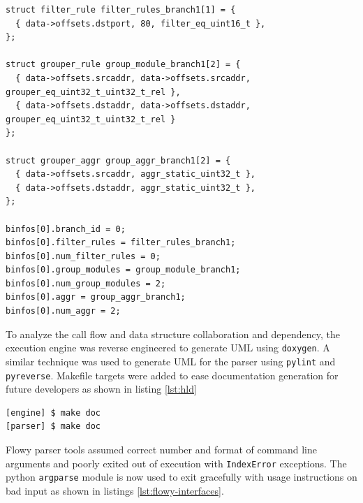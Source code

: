 \begin{lstlisting}
struct filter_rule filter_rules_branch1[1] = {
  { data->offsets.dstport, 80, filter_eq_uint16_t },
};

struct grouper_rule group_module_branch1[2] = {
  { data->offsets.srcaddr, data->offsets.srcaddr, grouper_eq_uint32_t_uint32_t_rel },
  { data->offsets.dstaddr, data->offsets.dstaddr, grouper_eq_uint32_t_uint32_t_rel }
};

struct grouper_aggr group_aggr_branch1[2] = {
  { data->offsets.srcaddr, aggr_static_uint32_t },
  { data->offsets.dstaddr, aggr_static_uint32_t },
};

binfos[0].branch_id = 0;
binfos[0].filter_rules = filter_rules_branch1;
binfos[0].num_filter_rules = 0;
binfos[0].group_modules = group_module_branch1;
binfos[0].num_group_modules = 2;
binfos[0].aggr = group_aggr_branch1;
binfos[0].num_aggr = 2;
\end{lstlisting}

To analyze the call flow and data structure collaboration and dependency, the
execution engine was reverse engineered to generate \ac{UML} using
\texttt{doxygen}.   A similar technique was
used to generate \ac{UML} for the parser using \texttt{pylint} and
\texttt{pyreverse}. Makefile targets were added to ease documentation
generation for future developers as shown in listing \ref{lst:hld}

\begin{lstlisting}
[engine] $ make doc
[parser] $ make doc
\end{lstlisting}

Flowy parser tools assumed correct number and format of command line arguments
and poorly  exited out of execution
with \texttt{IndexError} exceptions.  The python \texttt{argparse} module is
now used to exit gracefully with usage instructions on bad input as shown in
listings \ref{lst:flowy-interfaces}.

